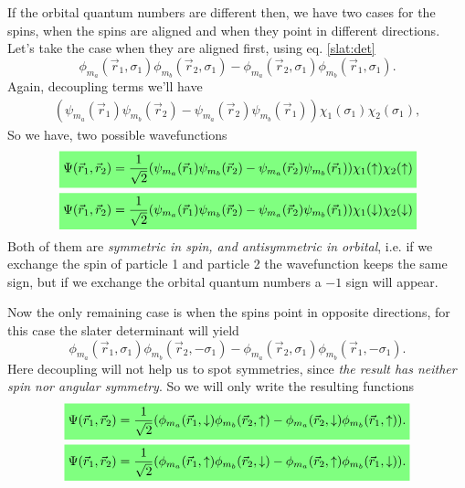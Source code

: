 \begin{questions}
\begin{solution}
If the orbital quantum numbers are different then, we have two cases for the spins, when the spins are aligned and when they point in different directions. Let's take the case when they are aligned first, using eq. \ref{slat:det}
\begin{equation*}
  \phi_{m_a}(\vec{r}_1,\sigma_1)\phi_{m_b}(\vec{r}_2,\sigma_1) - \phi_{m_a}(\vec{r}_2,\sigma_1)\phi_{m_b}(\vec{r}_1,\sigma_1).
\end{equation*}
Again, decoupling terms we'll have
\begin{equation}
  \begin{aligned}
    (\psi_{m_a}(\vec{r}_1)\psi_{m_b}(\vec{r}_2) - \psi_{m_a}(\vec{r}_2)\psi_{m_b}(\vec{r}_1))\chi_1(\sigma_1)\chi_2(\sigma_1),
  \end{aligned}
\end{equation}
So we have, two possible wavefunctions
\begin{eqnarray}
  \hlgreen{\Psi(\vec{r}_1,\vec{r}_2) = \frac{1}{\sqrt{2}} (\psi_{m_a}(\vec{r}_1)\psi_{m_b}(\vec{r}_2) - \psi_{m_a}(\vec{r}_2)\psi_{m_b}(\vec{r}_1))\chi_1(\uparrow)\chi_2(\uparrow)}\\
  \hlgreen{\Psi(\vec{r}_1,\vec{r}_2) = \frac{1}{\sqrt{2}} (\psi_{m_a}(\vec{r}_1)\psi_{m_b}(\vec{r}_2) - \psi_{m_a}(\vec{r}_2)\psi_{m_b}(\vec{r}_1))\chi_1(\downarrow)\chi_2(\downarrow)}
\end{eqnarray}
Both of them are \textit{symmetric in spin, and antisymmetric in orbital}, i.e. if we exchange the spin of particle 1 and particle 2 the wavefunction keeps the same sign, but if we exchange the orbital quantum numbers a $-1$ sign will appear.

Now the only remaining case is when the spins point in opposite directions, for this case the slater determinant will yield
\begin{equation*}
  \phi_{m_a}(\vec{r}_1,\sigma_1)\phi_{m_b}(\vec{r}_2,-\sigma_1) - \phi_{m_a}(\vec{r}_2,\sigma_1)\phi_{m_b}(\vec{r}_1,-\sigma_1).
\end{equation*}
Here decoupling will not help us to spot symmetries, since \textit{the result has neither spin nor angular symmetry}. So we will only write the resulting functions
\begin{eqnarray}
  \hlgreen{\Psi(\vec{r}_1,\vec{r}_2) = \frac{1}{\sqrt{2}} (\phi_{m_a}(\vec{r}_1,\downarrow)\phi_{m_b}(\vec{r}_2,\uparrow) - \phi_{m_a}(\vec{r}_2,\downarrow)\phi_{m_b}(\vec{r}_1,\uparrow)). }\\
  \hlgreen{\Psi(\vec{r}_1,\vec{r}_2) = \frac{1}{\sqrt{2}} (\phi_{m_a}(\vec{r}_1,\uparrow)\phi_{m_b}(\vec{r}_2,\downarrow) - \phi_{m_a}(\vec{r}_2,\uparrow)\phi_{m_b}(\vec{r}_1,\downarrow)). }
\end{eqnarray}
\end{solution}


\end{questions}

